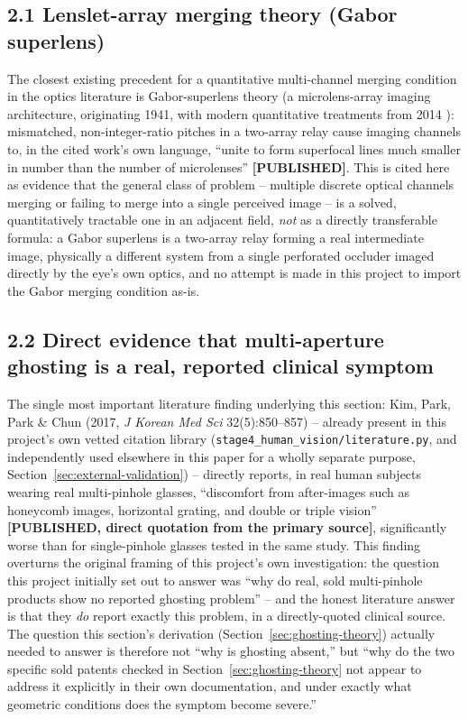 \subsection{2.1 Lenslet-array merging theory (Gabor superlens)}
The closest existing precedent for a quantitative multi-channel merging condition in
the optics literature is Gabor-superlens theory (a microlens-array imaging
architecture, originating 1941, with modern quantitative treatments from 2014
): mismatched, non-integer-ratio pitches in a two-array relay cause
imaging channels to, in the cited work's own language, ``unite to form superfocal
lines much smaller in number than the number of microlenses'' \textbf{[PUBLISHED]}.
This is cited here as evidence that the general class of problem -- multiple discrete
optical channels merging or failing to merge into a single perceived image -- is a
solved, quantitatively tractable one in an adjacent field, \emph{not} as a directly
transferable formula: a Gabor superlens is a two-array relay forming a real
intermediate image, physically a different system from a single perforated occluder
imaged directly by the eye's own optics, and no attempt is made in this project to
import the Gabor merging condition as-is.

\subsection{2.2 Direct evidence that multi-aperture ghosting is a real, reported clinical symptom}
The single most important literature finding underlying this section: Kim, Park, Park
\& Chun (2017, \emph{J Korean Med Sci} 32(5):850--857) \citep{kim2017} -- already
present in this project's own vetted citation library
(\texttt{stage4\_human\_vision/literature.py}, and independently used elsewhere in this
paper for a wholly separate purpose, Section~\ref{sec:external-validation}) -- directly
reports, in real human subjects wearing real multi-pinhole glasses, ``discomfort from
after-images such as honeycomb images, horizontal grating, and double or triple
vision'' \textbf{[PUBLISHED, direct quotation from the primary source]}, significantly
worse than for single-pinhole glasses tested in the same study. This finding overturns
the original framing of this project's own investigation: the question this project
initially set out to answer was ``why do real, sold multi-pinhole products show no
reported ghosting problem'' -- and the honest literature answer is that they
\emph{do} report exactly this problem, in a directly-quoted clinical source. The
question this section's derivation (Section~\ref{sec:ghosting-theory}) actually needed
to answer is therefore not ``why is ghosting absent,'' but ``why do the two specific
sold patents checked in Section~\ref{sec:ghosting-theory} not appear to address it
explicitly in their own documentation, and under exactly what geometric conditions does
the symptom become severe.''


